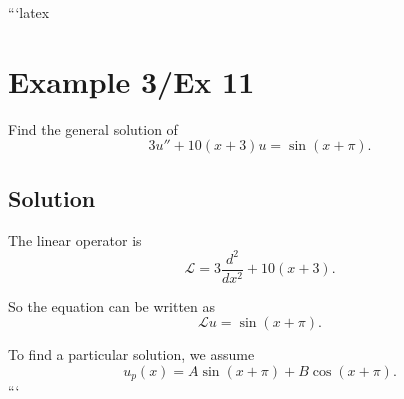 ```latex
\section*{Example 3/Ex 11}

Find the general solution of 
\begin{equation}
    3u'' + 10(x + 3)u = \sin(x + \pi).
\end{equation}

\subsection*{Solution}

The linear operator is 
\begin{equation}
    \mathcal{L} = 3\frac{d^2}{dx^2} + 10(x + 3).
\end{equation}

So the equation can be written as 
\begin{equation}
    \mathcal{L}u = \sin(x + \pi).
\end{equation}

To find a particular solution, we assume 
\begin{equation}
    u_p(x) = A \sin(x + \pi) + B \cos(x + \pi).
\end{equation}
```
